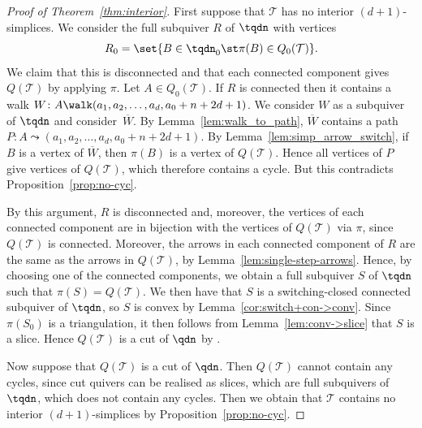 \begin{proof}[Proof of Theorem~\ref{thm:interior}]
First suppose that $\mathcal{T}$ has no interior $(d+1)$-simplices. We consider the full subquiver $R$ of $\tqdn$ with vertices \[R_{0} = \set{ B \in \tqdn_{0} \st \pi(B) \in Q_{0}(\mathcal{T})}.\] We claim that this is disconnected and that each connected component gives $Q(\mathcal{T})$ by applying $\pi$. Let $A \in Q_{0}(\mathcal{T})$. If $R$ is connected then it contains a walk $W \colon A \walk (a_{1}, a_{2}, \dots, a_{d}, a_{0} + n + 2d + 1)$. We consider $W$ as a subquiver of $\tqdn$ and consider~$\overline{W}$. By Lemma~\ref{lem:walk_to_path}, $\overline{W}$ contains a path $P \colon A \leadsto (a_{1}, a_{2}, \dots, a_{d}, a_{0} + n + 2d + 1)$. By Lemma~\ref{lem:simp_arrow_switch}, if $B$ is a vertex of $\overline{W}$, then $\pi(B)$ is a vertex of $Q(\mathcal{T})$. Hence all vertices of $P$ give vertices of $Q(\mathcal{T})$, which therefore contains a cycle. But this contradicts Proposition~\ref{prop:no-cyc}.

By this argument, $R$ is disconnected and, moreover, the vertices of each connected component are in bijection with the vertices of $Q(\mathcal{T})$ via $\pi$, since $Q(\mathcal{T})$ is connected. Moreover, the arrows in each connected component of $R$ are the same as the arrows in $Q(\mathcal{T})$, by Lemma~\ref{lem:single-step-arrows}. Hence, by choosing one of the connected components, we obtain a full subquiver $S$ of $\tqdn$ such that $\pi(S) = Q(\mathcal{T})$. We then have that $S$ is a switching-closed connected subquiver of $\tqdn$, so $S$ is convex by Lemma~\ref{cor:switch+con->conv}. Since $\pi(S_{0})$ is a triangulation, it then follows from Lemma~\ref{lem:conv->slice} that $S$ is a slice. Hence $Q(\mathcal{T})$ is a cut of $\qdn$ by \cite[Theorem 5.24]{io}.

Now suppose that $Q(\mathcal{T})$ is a cut of $\qdn$. Then $Q(\mathcal{T})$ cannot contain any cycles, since cut quivers can be realised as slices, which are full subquivers of $\tqdn$, which does not contain any cycles. Then we obtain that $\mathcal{T}$ contains no interior $(d + 1)$-simplices by Proposition~\ref{prop:no-cyc}.
\end{proof}
